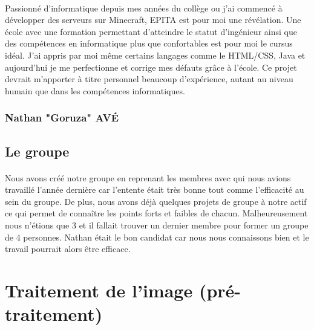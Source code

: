 \documentclass{article}
\begin{document}
\paragraph{}Passionné d'informatique depuis mes années du collège ou j'ai commencé à développer des serveurs sur Minecraft, EPITA est pour moi une révélation. Une école avec une formation permettant d'atteindre le statut d'ingénieur ainsi que des compétences en informatique plus que confortables est pour moi le cursus idéal. J'ai appris par moi même certains langages comme le HTML/CSS, Java et aujourd'hui je me perfectionne et corrige mes défauts grâce à l'école. Ce projet devrait m'apporter à titre personnel beaucoup d'expérience, autant au niveau humain que dans les compétences informatiques.

\subsubsection{Nathan "Goruza" AVÉ}


\newpage


\subsection{Le groupe}

\paragraph{}Nous avons créé notre groupe en reprenant les membres avec qui nous avions travaillé l'année dernière car l'entente était très bonne tout comme l'efficacité au sein du groupe. De plus, nous avons déjà quelques projets de groupe à notre actif ce qui permet de connaître les points forts et faibles de chacun. Malheureusement nous n'étions que 3 et il fallait trouver un dernier membre pour former un groupe de 4 personnes. Nathan était le bon candidat car nous nous connaissons bien et le travail pourrait alors être efficace.
\paragraph{}

\newpage

\section{Traitement de l'image (pré-traitement)}
\end{document}

